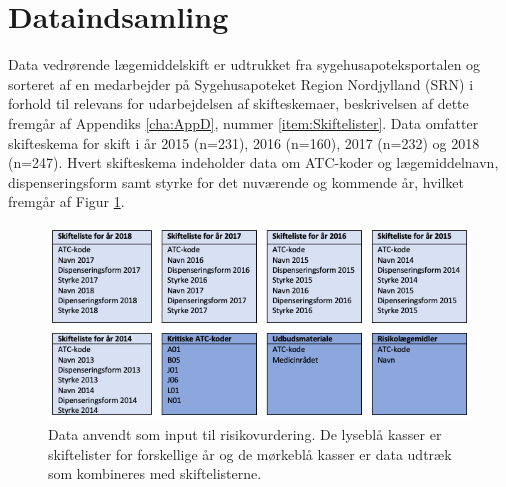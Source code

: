 
\section{Dataindsamling}
Data vedrørende lægemiddelskift er udtrukket fra sygehusapoteksportalen og sorteret af en medarbejder på Sygehusapoteket Region Nordjylland (SRN) i forhold til relevans for udarbejdelsen af skifteskemaer, beskrivelsen af dette fremgår af Appendiks \ref{cha:AppD}, nummer \ref{item:Skiftelister}. Data omfatter skifteskema for skift i år 2015 (n=231), 2016 (n=160), 2017 (n=232) og 2018 (n=247). Hvert skifteskema indeholder data om ATC-koder og lægemiddelnavn, dispenseringsform samt styrke for det nuværende og kommende år, hvilket fremgår af Figur \ref{fig:Input}.

\begin{figure}[H]\centering
\includegraphics[width=1\textwidth]{billeder/Input.png} 
	\caption{Data anvendt som input til risikovurdering. De lyseblå kasser er skiftelister for forskellige år og de mørkeblå kasser er data udtræk som kombineres med skiftelisterne.}
	\label{fig:Input}  
\end{figure}

